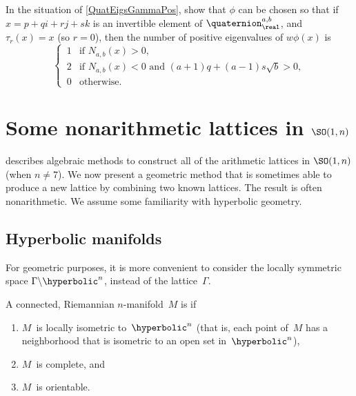 \begin{exercises}
\item \label{CountQuatEigsGammaPos}
In the situation of \cref{QuatEigsGammaPos}, show that $\phi$ can be chosen so that if $x = p + qi + rj +  sk$ is an invertible element of
$\quaternion^{a,b}_\real$, and $\tau_r(x) = x$ (so $r = 0$), then
the number of positive eigenvalues of $w \phi(x)$ is
 $$ \begin{cases}
 \,1 & \mbox{if $N_{a,b}(x) > 0$} , \\
 \,2 & \mbox{if $N_{a,b}(x) < 0$ and $(a+1)q + (a - 1) s \sqrt{b} > 0$} , \\
 \,0 & \mbox{otherwise}
 . \end{cases}
 $$


\end{exercises}







\section{Some nonarithmetic lattices in \texorpdfstring{$\SO(1,\lowercase{n})$}{SO(1,n)}}
 \label{NonArithSO1nSect}

 describes algebraic methods to
construct all of the arithmetic lattices in $\SO(1,n)$
(when $n \neq 7$). We now present a geometric method that
is sometimes able to produce a new lattice by combining
two known lattices. The result is often nonarithmetic.
We assume some familiarity with hyperbolic geometry.

\subsection{Hyperbolic manifolds}

For geometric purposes, it is more convenient to
consider the locally symmetric space $\Gamma \backslash
\hyperbolic^n$, instead of the lattice~$\Gamma$. 

\begin{defn}
 A connected, Riemannian $n$-manifold~$M$ is
 if
 \begin{enumerate}
 \item \label{HypMfldDefn-Hn}
 $M$~is locally isometric to~$\hyperbolic^n$ (that
is, each point of~$M$ has a neighborhood that is isometric
to an open set in~$\hyperbolic^n$),
 \item $M$~is complete, and
 \item $M$~is orientable.
 \end{enumerate}
 \end{defn}

